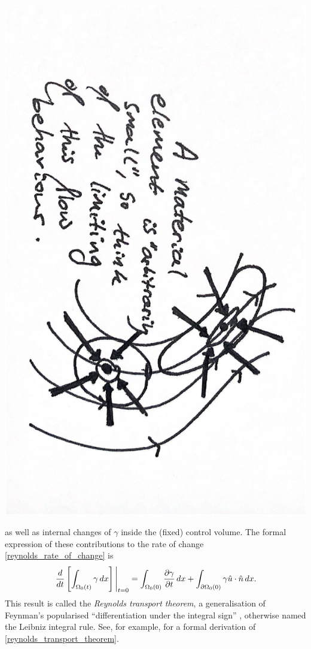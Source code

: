 \begin{center}
\includegraphics[angle=90,page=7,width=0.66\linewidth]{figures/2.pdf}
\end{center}

as well as internal changes of $\gamma$ inside the (fixed) control volume.
The formal expression of these contributions to the rate of change \eqref{reynolds_rate_of_change} is
\begin{equation}\label{reynolds_transport_theorem}
    \eval{\frac{d}{dt}\left[\int_{\Omega_0(t)}\gamma\,dx\right]}_{t=0} =
        \int_{\Omega_0(0)}\Part{\gamma}{t}\,dx + \int_{\partial\Omega_0(0)}\gamma \hat{u}\cdot\hat{n} \,dx.
\end{equation}
This result is called the \textit{Reynolds transport theorem},
a generalisation of Feynman's popularised ``differentiation under the integral sign'' \cite{feynman_trick},
otherwise named the Leibniz integral rule. See, for example, \cite{leal} for a formal derivation of \eqref{reynolds_transport_theorem}.
